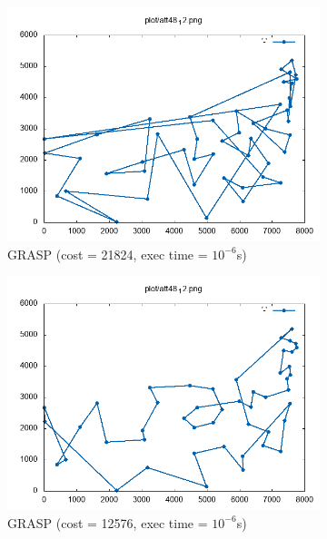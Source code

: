\begin{figure}[h]
\begin{subfigure}{.5\textwidth}
	\includegraphics[width=\columnwidth]{../res/att48_12_1.png}
	\caption{GRASP (cost = 21824, exec time = $ 10^{-6} $s)}
	\label{fig:att48_GRASP1}
	\end{subfigure}
	\begin{subfigure}{.5\textwidth}
	\centering
	\includegraphics[width=\columnwidth]{../res/att48_12_2.png}
	\caption{GRASP (cost = 12576, exec time = $ 10^{-6} $s)}
	\label{fig:att48_GRASP2}
	\end{subfigure}
	\begin{subfigure}{.5\textwidth}
	\centering

\end{subfigure}
\end{figure}
